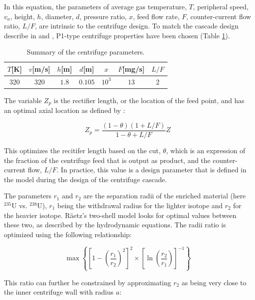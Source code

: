 In this equation, the parameters of average gas temperature, $T$, peripheral speed,
$v_a$, height, $h$, diameter, $d$, pressure ratio, $x$, feed flow rate, $F$,
counter-current flow ratio, $L/F$, are intrinsic to the centrifuge design.
To match the cascade design describe in \cite{glaser.2008} and \cite{walker.2017},
P1-type centrifuge properties have been chosen (Table \ref{tab:centrifuges}).

\begin{table}[htb]
    \centering
    \caption{Summary of the centrifuge parameters.}
    \begin{tabular}{ccccccc}
        \toprule
        $T$[K] & $v$[m/s] & $h$[m] & $d$[m]   & $x$      & $F$[mg/s]  & $L/F$  \\
        \midrule
        320    & $320$    & $1.8$  & $0.105$  & $10^{3}$ & $13$       & 2   \\
        \bottomrule
    \end{tabular}
    \label{tab:centrifuges}
\end{table}

The variable $Z_p$ is the rectifier length, or the location of the feed point,
and has an optimal axial location as defined by \cite{raetz.phd}:

\begin{equation}
    Z_p = \frac{(1-\theta)(1+L/F)}{1-\theta+L/F}Z
\end{equation}

This optimizes the recitifer length based on the cut, $\theta$, which is an expression
of the fraction of the centrifuge feed that is output as product, and the counter-current
flow, $L/F$. In practice, this value is a design parameter that is defined in the model
during the design of the centrifuge cascade.

The parameters $r_1$ and $r_2$ are the separation radii of the enriched material
(here ${}^{235}\mathrm{U}$ vs. ${}^{238}\mathrm{U}$), $r_1$ being the withdrawal
radius for the lighter isotope and $r_2$ for the heavier isotope. R\"aetz's
two-shell model looks for optimal values between these two, as described by
the hydrodynamic equations. The radii ratio is optimized using the following relationship:

\begin{equation}
    \max \left\{ \left[1-\left(\frac{r_1}{r_2}\right)^2 \right]^2 \times \left[ \ln \left(\frac{r_2}{r_1} \right) \right]^{-1} \right\}
\end{equation}

This ratio can further be constrained by approximating $r_2$ as being very close
to the inner centrifuge wall with radius $a$:


